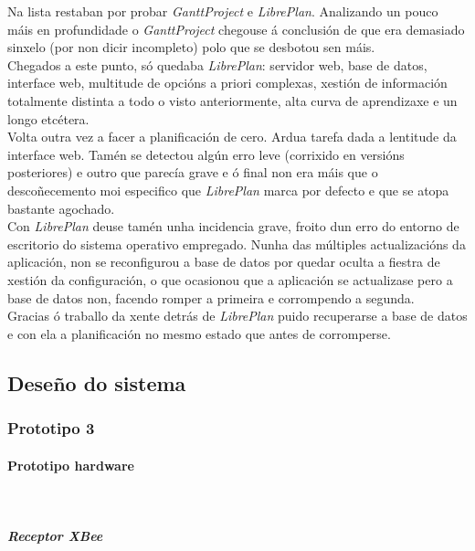   Na lista restaban por probar \textit{GanttProject} e \textit{LibrePlan}.
  Analizando un pouco máis en profundidade o \textit{GanttProject} chegouse á
  conclusión de que era demasiado sinxelo (por non dicir incompleto) polo que
  se desbotou sen máis.\\

  Chegados a este punto, só quedaba \textit{LibrePlan}: servidor web, base de
  datos, interface web, multitude de opcións a priori complexas, xestión de
  información totalmente distinta a todo o visto anteriormente, alta curva de
  aprendizaxe e un longo etcétera.\\

  Volta outra vez a facer a planificación de cero. Ardua tarefa dada a
  lentitude da interface web. Tamén se detectou algún erro leve (corrixido en
  versións posteriores) e outro que parecía grave e ó final non era máis que o
  descoñecemento moi especifico que \textit{LibrePlan} marca por defecto e que
  se atopa bastante agochado. \\

  Con \textit{LibrePlan} deuse tamén unha incidencia grave, froito dun erro do
  entorno de escritorio do sistema operativo empregado. Nunha das múltiples
  actualizacións da aplicación, non se reconfigurou a base de datos por quedar
  oculta a fiestra de xestión da configuración, o que ocasionou que a
  aplicación se actualizase pero a base de datos non, facendo romper a primeira
  e corrompendo a segunda. \\

  Gracias ó traballo da xente detrás de \textit{LibrePlan} puido recuperarse a
  base de datos e con ela a planificación no mesmo estado que antes de
  corromperse.

 \subsection{Deseño do sistema}

  \subsubsection{Prototipo 3}

   \paragraph{Prototipo hardware}\mbox{}\\

    \subparagraph{Receptor XBee}\mbox{}\\

